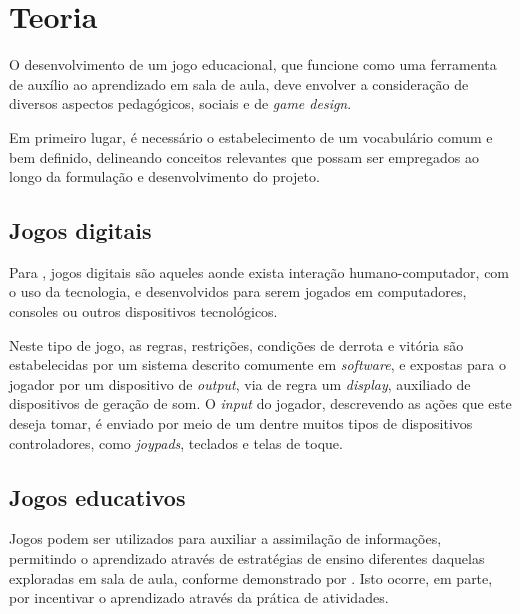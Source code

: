 
\chapter{Teoria}\label{cap-teoria}

O desenvolvimento de um jogo educacional, que funcione como uma ferramenta de auxílio ao
aprendizado em sala de aula, deve envolver a consideração de diversos aspectos
pedagógicos, sociais e de \textit{game design}.

Em primeiro lugar, é necessário o estabelecimento de um vocabulário comum e bem
definido, delineando conceitos relevantes que possam ser empregados ao longo da 
formulação e desenvolvimento do projeto.

\section{Jogos digitais}\label{sec-jogosdigitais}

Para \cite{correia:2009:digital_games_spore}, jogos digitais são aqueles aonde exista
interação humano-computador, com o uso da tecnologia, e desenvolvidos para serem 
jogados em computadores, consoles ou outros dispositivos tecnológicos.

Neste tipo de jogo, as regras, restrições, condições de derrota e vitória são
estabelecidas por um sistema descrito comumente em \textit{software}, e expostas
para o jogador por um dispositivo de \textit{output}, via de regra um \textit{display},
auxiliado de dispositivos de geração de som. O \textit{input} do jogador, descrevendo
as ações que este deseja tomar, é enviado por meio de um dentre muitos tipos de
dispositivos controladores, como \textit{joypads}, teclados e telas de toque.

\section{Jogos educativos}\label{sec-jogosdigitais}

Jogos podem ser utilizados para auxiliar a assimilação de informações, permitindo
o aprendizado através de estratégias de ensino diferentes daquelas exploradas em sala
de aula, conforme demonstrado por \cite{fernandes:2012:digital_education}. Isto 
ocorre, em parte, por incentivar o aprendizado através da prática de atividades.

